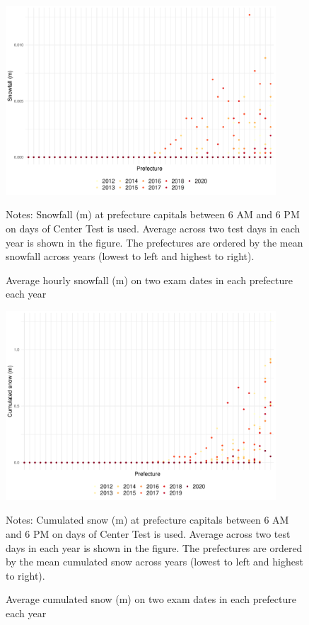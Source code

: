 \documentclass[12pt,letterpaper]{article}
\begin{document}
\begin{figure}[H]
  \centering
  \caption{Average hourly snowfall (m) on two exam dates in each prefecture each year}
  \includegraphics[width = 0.9\textwidth]{../Output/images/snowfall_diff.pdf}
  \label{fig:snowfall_diff}
  \footnotesize
  \begin{tablenotes}
    \item Notes:
      Snowfall (m) at prefecture capitals between 6 AM and 6 PM on days of Center Test is used.
      Average across two test days in each year is shown in the figure.
      The prefectures are ordered by the mean snowfall across years (lowest to left and highest to right).
  \end{tablenotes}
\end{figure}

\begin{figure}[H]
  \centering
  \caption{Average cumulated snow (m) on two exam dates in each prefecture each year}
  \includegraphics[width = 0.9\textwidth]{../Output/images/cum_snow_diff.pdf}
  \label{fig:cum_snow_diff}
  \footnotesize
  \begin{tablenotes}
    \item Notes:
      Cumulated snow (m) at prefecture capitals between 6 AM and 6 PM on days of Center Test is used.
      Average across two test days in each year is shown in the figure.
      The prefectures are ordered by the mean cumulated snow across years (lowest to left and highest to right).
  \end{tablenotes}
\end{figure}
\end{document}
